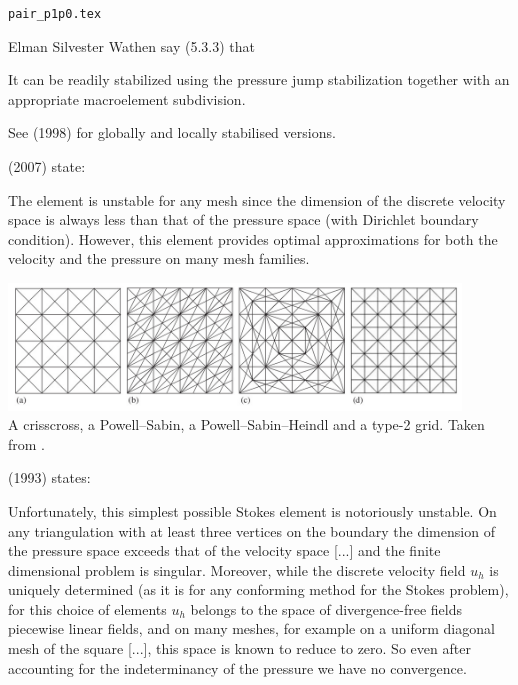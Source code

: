 \begin{flushright} {\tiny {\color{gray} \tt  pair\_p1p0.tex}} \end{flushright}





Elman Silvester Wathen say (5.3.3) that 
\begin{displayquote}
{\color{darkgray}
It can be readily stabilized using the pressure jump
stabilization together with an appropriate macroelement subdivision.}
\end{displayquote}
See \textcite{nosi98} (1998) for globally and locally stabilised versions. 

\textcite{qizh07b} (2007) state: 
\begin{displayquote}
{\color{darkgray}
The element is unstable for any mesh since
the dimension of the discrete velocity space is always less than that of the pressure space (with
Dirichlet boundary condition).
However, this element provides optimal approximations for both
the velocity and the pressure on many mesh families.} 
\end{displayquote}

\begin{center}
\includegraphics[width=12cm]{images/pair_p1p0/qizh07}\\
{\captionfont A crisscross, a Powell–Sabin, a Powell–Sabin–Heindl and a type-2 grid.
Taken from \cite{qizh07}.}
\end{center}

\textcite{arno93} (1993) states: 
\begin{displayquote}
{\color{darkgray}
Unfortunately, this simplest possible Stokes element is notoriously unstable. On any 
triangulation with at least three vertices on the boundary the dimension of the pressure
space exceeds that of the velocity space [...] and the finite
dimensional problem is singular. 
Moreover, while the discrete velocity field $u_h$ is uniquely
determined (as it is for any conforming method for the Stokes problem), for this choice of
elements $u_h$ belongs to the space of divergence-free fields piecewise linear fields, and on
many meshes, for example on a uniform diagonal mesh of the square [...],
this space is known to reduce to zero. So even after accounting for the indeterminancy of
the pressure we have no convergence.}
\end{displayquote}

